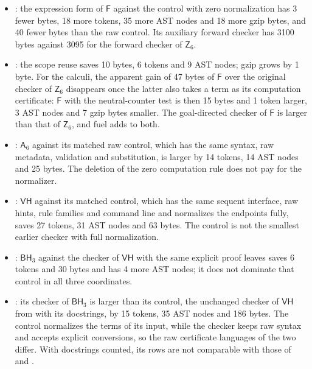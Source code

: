 \begin{itemize}
 control saves 50 bytes, 10 tokens and 13 AST nodes; gzip grows by 2 bytes.
 The two rows for the canonical recursor checker measure a refactoring of
 an inherited program and no change of rules.
\item {}: the expression form of $\mathsf{F}$ against
 the control with zero normalization has 3 fewer bytes, 18 more tokens, 35
 more AST nodes and 18 more gzip bytes, and 40 fewer bytes than the raw
 control. Its auxiliary forward checker has 3100 bytes against 3095 for the
 forward checker of $\mathsf{Z}_6$.
\item {}: the scope reuse saves 10 bytes, 6 tokens
 and 9 AST nodes; gzip grows by 1 byte. For the calculi, the apparent gain
 of 47 bytes of $\mathsf{F}$ over the original checker of $\mathsf{Z}_6$
 disappears once the latter also takes a term as its computation
 certificate: $\mathsf{F}$ with the neutral-counter test is then 15 bytes
 and 1 token larger, 3 AST nodes and 7 gzip bytes smaller. The goal-directed
 checker of $\mathsf{F}$ is larger than that of $\mathsf{Z}_6$, and fuel
 adds to both.
\item {}: $\mathsf{A}_6$ against its matched raw
 control, which has the same syntax, raw metadata, validation and
 substitution, is larger by 14 tokens, 14 AST nodes and 25 bytes. The
 deletion of the zero computation rule does not pay for the normalizer.
\item {}: $\mathsf{VH}$ against its matched control,
 which has the same sequent interface, raw hints, rule families and command
 line and normalizes the endpoints fully, saves 27 tokens, 31 AST nodes and
 63 bytes. The control is not the smallest earlier checker with full
 normalization.
\item {}: $\mathsf{BH}_3$ against the checker of
 $\mathsf{VH}$ with the same explicit proof leaves saves 6 tokens and 30
 bytes and has 4 more AST nodes; it does not dominate that control in all
 three coordinates.
\item {}: its checker of $\mathsf{BH}_3$ is larger
 than its control, the unchanged checker of $\mathsf{VH}$ from
  with its docstrings, by 15 tokens, 35 AST nodes and
 186 bytes. The control normalizes the terms of its input, while the checker
 keeps raw syntax and accepts explicit conversions, so the raw certificate
 languages of the two differ. With docstrings counted, its rows are not
 comparable with those of  and .
\end{itemize}

